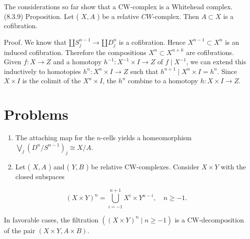 \documentclass[10pt, letterpaper]{article}
\begin{document}
The considerations so far show that a CW-complex is a Whitehead complex.\\
(8.3.9) Proposition. Let ( $X, A$ ) be a relative $C W$-complex. Then $A \subset X$ is a cofibration.

Proof. We know that $\amalg S_{j}^{n-1} \rightarrow \amalg D_{j}^{n}$ is a cofibration. Hence $X^{n-1} \subset X^{n}$ is an induced cofibration. Therefore the compositions $X^{n} \subset X^{n+k}$ are cofibrations. Given $f: X \rightarrow Z$ and a homotopy $h^{-1}: X^{-1} \times I \rightarrow Z$ of $f \mid X^{-1}$, we can extend this inductively to homotopies $h^{n}: X^{n} \times I \rightarrow Z$ such that $h^{n+1} \mid X^{n} \times I=h^{n}$. Since $X \times I$ is the colimit of the $X^{n} \times I$, the $h^{n}$ combine to a homotopy $h: X \times I \rightarrow Z$.

\section*{Problems}
\begin{enumerate}
  \item The attaching map for the $n$-cells yields a homeomorphism $\bigvee_{j}\left(D^{n} / S^{n-1}\right)_{j} \cong X / A$.
  \item Let ( $X, A$ ) and ( $Y, B$ ) be relative CW-complexes. Consider $X \times Y$ with the closed subspaces
\end{enumerate}

$$
(X \times Y)^{n}=\bigcup_{i=-1}^{n+1} X^{i} \times Y^{n-i}, \quad n \geq-1 .
$$

In favorable cases, the filtration $\left((X \times Y)^{n} \mid n \geq-1\right)$ is a CW-decomposition of the pair $(X \times Y, A \times B)$.
\end{document}
